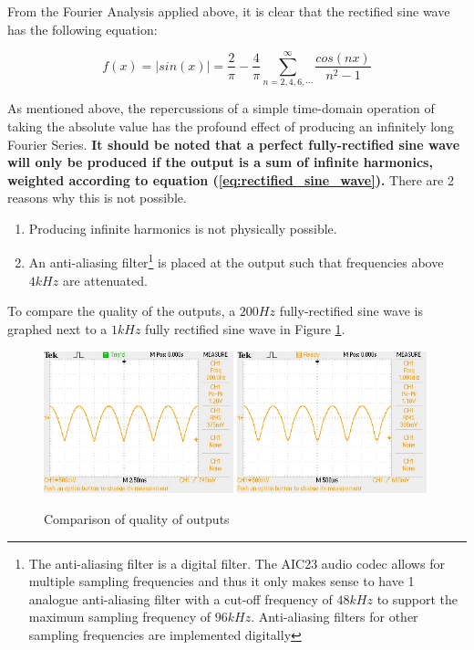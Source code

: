 \documentclass{article}
\begin{document}
From the Fourier Analysis applied above, it is clear that the rectified sine wave has the following equation:

\begin{equation}\label{eq:rectified_sine_wave}
    f(x)=|sin(x)|=\frac{2}{\pi}-\frac{4}{\pi}\sum_{n=2,4,6,\cdots}^{\infty}\frac{cos(nx)}{n^2-1}
\end{equation}

As mentioned above, the repercussions of a simple time-domain operation of taking the absolute value has the profound effect of producing an infinitely long Fourier Series. \textbf{It should be noted that a perfect fully-rectified sine wave will only be produced if the output is a sum of infinite harmonics, weighted according to equation (\ref{eq:rectified_sine_wave}).} There are 2 reasons why this is not possible.

\begin{enumerate}
    \item Producing infinite harmonics is not physically possible.
    \item An anti-aliasing filter\footnote{The anti-aliasing filter is a digital filter. The AIC23 audio codec allows for multiple sampling frequencies and thus it only makes sense to have 1 analogue anti-aliasing filter with a cut-off frequency of $48kHz$ to support the maximum sampling frequency of $96kHz$. Anti-aliasing filters for other sampling frequencies are implemented digitally} is placed at the output such that frequencies above $4kHz$ are attenuated.
\end{enumerate}

To compare the quality of the outputs, a $200Hz$ fully-rectified sine wave is graphed next to a $1kHz$ fully rectified sine wave in Figure \ref{fig:compare_output_quality_pranav}. 

\begin{figure}[H]
    \centering
    \includegraphics[width=0.49\textwidth]{ex1_200Hz_output_2.JPG}
    \includegraphics[width=0.49\textwidth]{ex1_1000Hz_output.JPG}
    \caption{Comparison of quality of outputs}
    \label{fig:compare_output_quality_pranav}
\end{figure}
\end{document}
